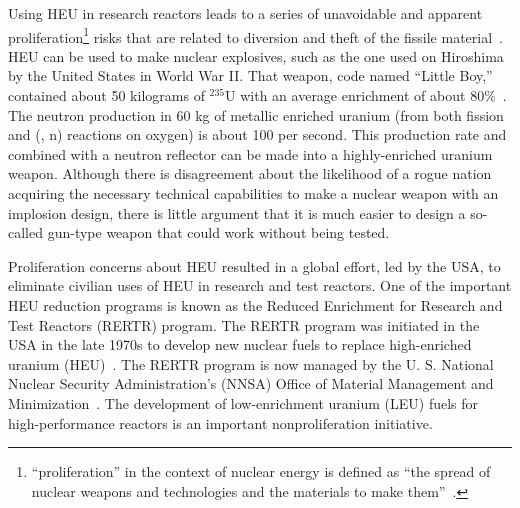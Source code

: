 Using HEU in research reactors leads to a series of unavoidable and apparent proliferation\footnote{``proliferation'' in the context of nuclear energy is defined as ``the spread of nuclear weapons and technologies and the materials to make them''~\cite{montgomery2009}.} risks that are related to diversion and theft of the fissile material~\cite{donnelly1980}.
HEU can be used to make nuclear explosives, such as the one used on Hiroshima by the United States in World War II. That weapon, code named ``Little Boy,'' contained about 50 kilograms of $^{235}$U with an average enrichment of about 80\%~\cite{serber1992alamos}. The neutron production in 60 kg of metallic enriched uranium (from both fission and (\textalpha, n) reactions on oxygen) is about 100 per second. This production rate and combined with a neutron reflector can be made into a highly-enriched uranium weapon. Although there is disagreement about the likelihood of a rogue nation acquiring the necessary technical capabilities to make a nuclear weapon with an implosion design, there is little argument that it is much easier to design a so-called gun-type weapon that could work without being tested.

Proliferation concerns about HEU resulted in a global effort, led by the USA, to eliminate civilian uses of HEU in research and test reactors. One of the important HEU reduction programs is known as the Reduced Enrichment for Research and Test Reactors (RERTR) program. The RERTR program was initiated in the USA in the late 1970s to develop new nuclear fuels to replace high-enriched uranium (HEU)~\cite{travelli1980current,snelgrove1997development}\@.  The RERTR program is now managed by the U. S. National Nuclear Security Administration's (NNSA) Office of Material Management and Minimization~\cite{burkes2021thermal}. The development of low-enrichment uranium (LEU) fuels for high-performance reactors is an important nonproliferation initiative.

